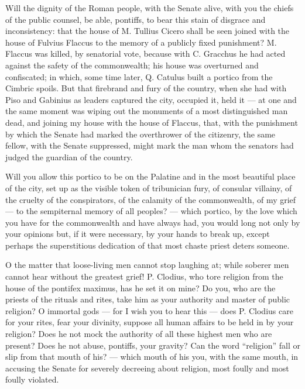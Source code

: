  Will the dignity of the Roman people, with the Senate alive, with you the chiefs of the public counsel, be able, pontiffs, to bear this stain of disgrace and inconsistency: that the house of M. Tullius Cicero shall be seen joined with the house of Fulvius Flaccus to the memory of a publicly fixed punishment? M. Flaccus was killed, by senatorial vote, because with C. Gracchus he had acted against the safety of the commonwealth; his house was overturned and confiscated; in which, some time later, Q. Catulus built a portico from the Cimbric spoils. But that firebrand and fury of the country, when she had with Piso and Gabinius as leaders captured the city, occupied it, held it --- at one and the same moment was wiping out the monuments of a most distinguished man dead, and joining my house with the house of Flaccus, that, with the punishment by which the Senate had marked the overthrower of the citizenry, the same fellow, with the Senate suppressed, might mark the man whom the senators had judged the guardian of the country.

 Will you allow this portico to be on the Palatine and in the most beautiful place of the city, set up as the visible token of tribunician fury, of consular villainy, of the cruelty of the conspirators, of the calamity of the commonwealth, of my grief --- to the sempiternal memory of all peoples? --- which portico, by the love which you have for the commonwealth and have always had, you would long not only by your opinions but, if it were necessary, by your hands to break up, except perhaps the superstitious dedication of that most chaste priest deters someone.

 O the matter that loose-living men cannot stop laughing at; while soberer men cannot hear without the greatest grief! P. Clodius, who tore religion from the house of the pontifex maximus, has he set it on mine? Do you, who are the priests of the rituals and rites, take him as your authority and master of public religion? O immortal gods --- for I wish you to hear this --- does P. Clodius care for your rites, fear your divinity, suppose all human affairs to be held in by your religion? Does he not mock the authority of all these highest men who are present? Does he not abuse, pontiffs, your gravity? Can the word ``religion'' fall or slip from that mouth of his? --- which mouth of his you, with the same mouth, in accusing the Senate for severely decreeing about religion, most foully and most foully violated.

